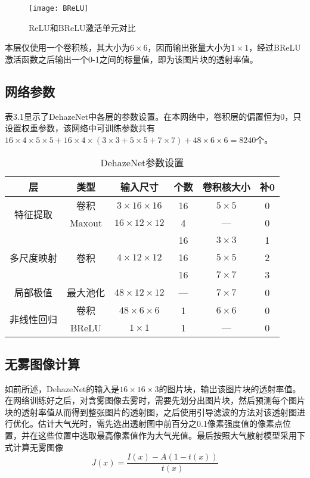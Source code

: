 \documentclass[a4paper, 12pt, oneside]{report}
\begin{document}
{\begin{figure}[H]
\centering
\texttt{[image: BReLU]}
\caption{ReLU和BReLU激活单元对比}
\end{figure}
本层仅使用一个卷积核，其大小为$6 \times 6$，因而输出张量大小为$1 \times 1$，经过BReLU激活函数之后输出一个0-1之间的标量值，即为该图片块的透射率值。

\subsection{网络参数\quad}
表3.1显示了DehazeNet中各层的参数设置。在本网络中，卷积层的偏置恒为0，只设置权重参数，该网络中可训练参数共有$16 \times 4 \times 5 \times 5 + 16 \times 4 \times (3 \times 3 + 5 \times 5 + 7 \times 7) + 48 \times 6 \times 6 = 8240$个。

\begin{table}[htbp]
  \centering
  \caption{DehazeNet参数设置}
    \begin{tabular}{c|c|c|c|c|c}
    \hline
    层     & 类型    & 输入尺寸  & 个数    & 卷积核大小 & 补0 \\
    \hline
    \multirow{2}[1]{*}{特征提取} & 卷积    & $3 \times 16 \times 16$ & 16    & $5 \times 5$ & 0 \\
          & Maxout & $16 \times 12 \times 12$ & 4     & —     & 0 \\
	\hline
    \multirow{3}[0]{*}{多尺度映射} & \multirow{3}[0]{*}{卷积} & \multirow{3}[0]{*}{$4 \times 12 \times 12$} & 16    & $3 \times 3$ & 1 \\
          &       &       & 16    & $5 \times 5$ & 2 \\
          &       &       & 16    & $7 \times 7$ & 3 \\
	\hline
    局部极值  & 最大池化  & $48 \times 12 \times 12$ & —     & $7 \times 7$ & 0 \\
	\hline
    \multirow{2}[1]{*}{非线性回归} & 卷积    & $48 \times 6 \times 6$ & 1     & $6 \times 6$ & 0 \\
          & BReLU & $1 \times 1$ & 1     & —     & 0 \\
    \hline
    \end{tabular}%
  \label{tab:3.1}%
\end{table}%

\subsection{无雾图像计算\quad}
如前所述，DehazeNet的输入是$16 \times 16 \times 3$的图片块，输出该图片块的透射率值。在网络训练好之后，对含雾图像去雾时，需要先划分出图片块，然后预测每个图片块的透射率值从而得到整张图片的透射图，之后使用引导滤波的方法对该透射图进行优化。估计大气光时，需先选出透射图中前百分之0.1像素强度值的像素点位置，并在这些位置中选取最高像素值作为大气光值。最后按照大气散射模型采用下式计算无雾图像
\begin{equation}
J(x) = \frac{I(x) - A(1 - t(x))}{t(x)}
\end{equation}

}
\end{document}
